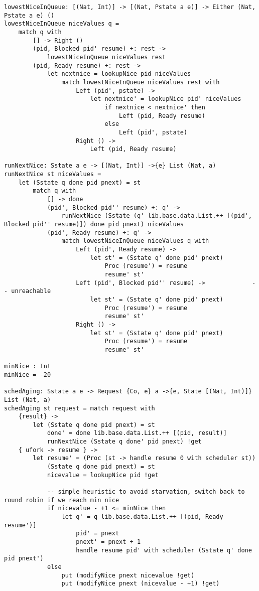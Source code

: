 \documentclass[logo,bsc,singlespacing,parskip]{infthesis}
\begin{document}
\begin{lstlisting}[language=unison]
lowestNiceInQueue: [(Nat, Int)] -> [(Nat, Pstate a e)] -> Either (Nat, Pstate a e) ()
lowestNiceInQueue niceValues q = 
    match q with 
        [] -> Right ()
        (pid, Blocked pid' resume) +: rest -> 
            lowestNiceInQueue niceValues rest
        (pid, Ready resume) +: rest ->
            let nextnice = lookupNice pid niceValues
                match lowestNiceInQueue niceValues rest with 
                    Left (pid', pstate) -> 
                        let nextnice' = lookupNice pid' niceValues
                            if nextnice < nextnice' then 
                                Left (pid, Ready resume)
                            else 
                                Left (pid', pstate)
                    Right () -> 
                        Left (pid, Ready resume)

runNextNice: Sstate a e -> [(Nat, Int)] ->{e} List (Nat, a)
runNextNice st niceValues = 
    let (Sstate q done pid pnext) = st
        match q with
            [] -> done
            (pid', Blocked pid'' resume) +: q' -> 
                runNextNice (Sstate (q' lib.base.data.List.++ [(pid', Blocked pid'' resume)]) done pid pnext) niceValues
            (pid', Ready resume) +: q' ->
                match lowestNiceInQueue niceValues q with
                    Left (pid', Ready resume) -> 
                        let st' = (Sstate q' done pid' pnext)
                            Proc (resume') = resume
                            resume' st'
                    Left (pid', Blocked pid'' resume) ->             -- unreachable
                        let st' = (Sstate q' done pid' pnext)
                            Proc (resume') = resume
                            resume' st'
                    Right () -> 
                        let st' = (Sstate q' done pid' pnext)
                            Proc (resume') = resume
                            resume' st'

minNice : Int
minNice = -20

schedAging: Sstate a e -> Request {Co, e} a ->{e, State [(Nat, Int)]} List (Nat, a)
schedAging st request = match request with
    {result} ->
        let (Sstate q done pid pnext) = st
            done' = done lib.base.data.List.++ [(pid, result)]
            runNextNice (Sstate q done' pid pnext) !get
    { ufork -> resume } ->
        let resume' = (Proc (st -> handle resume 0 with scheduler st))
            (Sstate q done pid pnext) = st
            nicevalue = lookupNice pid !get

            -- simple heuristic to avoid starvation, switch back to round robin if we reach min nice
            if nicevalue - +1 <= minNice then
                let q' = q lib.base.data.List.++ [(pid, Ready resume')]
                    pid' = pnext
                    pnext' = pnext + 1
                    handle resume pid' with scheduler (Sstate q' done pid pnext')
            else
                put (modifyNice pnext nicevalue !get)
                put (modifyNice pnext (nicevalue - +1) !get)


\end{lstlisting}
\end{document}
